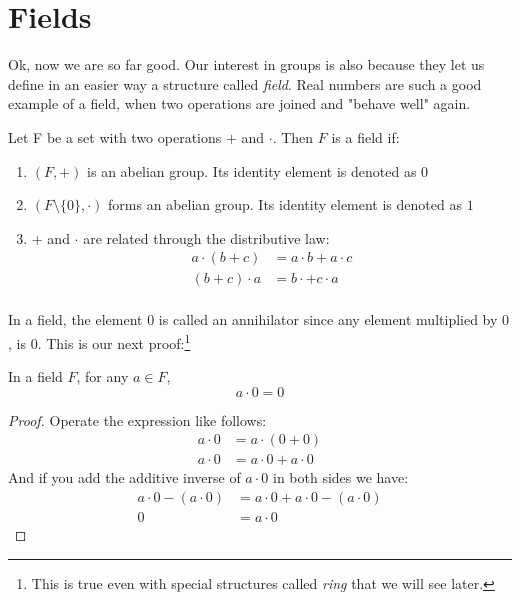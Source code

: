 \documentclass{tufte-handout}
\begin{document}
\section{Fields}

Ok, now we are so far good. Our interest in groups is also because they let us define in an easier way a structure called \textit{field}. Real numbers are such a good example of a field, when two operations are joined and "behave well" again.

\begin{definition}[Field]
	Let F be a set with two operations $+$ and $\cdot$. Then $F$ is a field if:
	\begin{enumerate}
		\item $(F, +)$ is an abelian group. Its identity element is denoted as $0$
		\item $(F \setminus \{0\}, \cdot)$ forms an abelian group. Its identity element is denoted as $1$
		\item $+$ and $\cdot$ are related through the distributive law:
		\begin{align*}
			a \cdot (b + c) &= a\cdot b + a\cdot c\\
			(b + c) \cdot a &= b \cdot + c \cdot a\\
		\end{align*}
	\end{enumerate}
\end{definition}

In a field, the element $0$ is called an annihilator since any element multiplied by $0$, is $0$. This is our next proof:\footnote{This is true even with special structures called \textit{ring} that we will see later.}
\begin{theorem}
	In a field $F$, for any $a \in F$, $$a \cdot 0 = 0$$
\end{theorem}
\begin{proof}
	Operate the expression like follows:
	\begin{align*}
		a\cdot 0 &= a\cdot (0 + 0)\\
		a\cdot 0 &= a\cdot 0 + a\cdot 0
	\end{align*}
	And if you add the additive inverse of $a\cdot 0$ in both sides we have:
	\begin{align*}
		a\cdot 0 - (a\cdot 0) &= a\cdot 0 + a\cdot 0 - (a\cdot 0)\\
		0 &= a\cdot 0
	\end{align*}
\end{proof}
\end{document}
